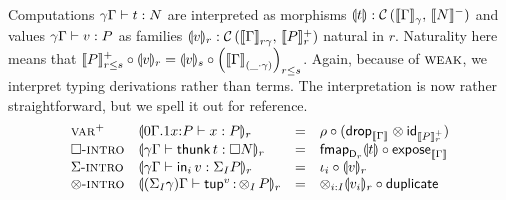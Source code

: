 \documentclass[acmsmall,review,anonymous]{acmart}\settopmatter{printfolios=true,printccs=false,printacmref=false}
\begin{document}
Computations $\qCompTy \gamma \Gamma t N$ are interpreted as morphisms
$\dent t : \Hom {\Den\Gamma\gamma} {\denn N}$ and values
$\qValTy \gamma \Gamma v P$ as families
$\denv v r : \Hom {\Den\Gamma{r\gamma}} {\Denp P r}$ natural in $r$.
Naturality here means that
$\Denp P {r \leq s} \comp \denv v r = \denv v s \comp \left(\Den \Gamma {(\_
    \cdot \gamma)}\right)_{r \leq s}$.
Again, because of $\rweak$, we interpret typing derivations rather than terms.
The interpretation is now rather straightforward, but we spell it out for reference.
\[
\begin{array}{llcl}
\rvar^+
  & \denv {\ValTy{\qext 0 \Gamma 1 x P} x P} r
  & = & \Gr \comp (\tdrop[\den\Gamma] \otimes \tid[\Denp P r])
\\
\rintro\Box
  & \denv {\qValTy \gamma \Gamma {\thunk t} {\Box N}} r
  & = & \fmapt[{\D[r]}]{\dent t} \comp \expose[\den \Gamma]
\\
\rintro\GS
  & \denv{\qValTy \gamma \Gamma {\inj i v} {\sumt I P}} r
  & = & \iota_i \comp \denv v r
\\
\rintro\otimes
  & \denv{\pValTy {\sumt I \gamma} \Gamma {\tup v} {\tupt I P}} r
  & = & \tupt {i:I} \denv {v_i}r \comp \duplicate
\\
\end{array}
\]
\end{document}
